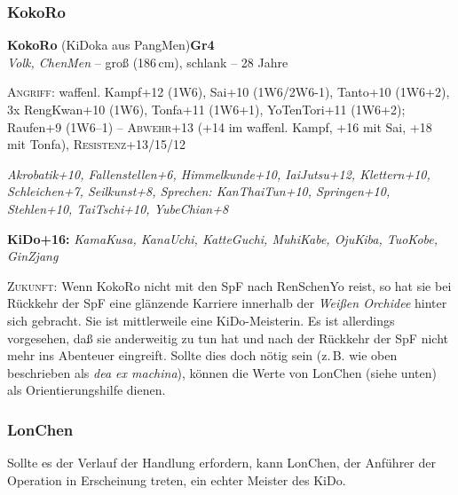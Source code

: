 \documentclass[
a4paper,
twoside,
DIV=calc,
BCOR=4mm,
fontsize=9pt,
twocolumn=on,
titlepage=on,
parskip=half
]{scrartcl}
\begin{document}
\subsubsection{KokoRo}



\textbf{KokoRo} (KiDoka aus PangMen)\hfill \textbf{Gr4}\\
\emph{Volk, ChenMen} -- groß (186\,cm), schlank -- 28 Jahre


\textsc{Angriff:} waffenl. Kampf+12 (1W6), Sai+10 (1W6/2W6-1),
Tanto+10 (1W6+2), 3x RengKwan+10 (1W6), Tonfa+11 (1W6+1), YoTenTori+11
(1W6+2); Raufen+9 (1W6--1) -- \textsc{Abwehr}+13 (+14 im
waffenl. Kampf, +16 mit Sai, +18 mit Tonfa),
\textsc{Resistenz}+13/15/12

\emph{Akrobatik+10, Fallenstellen+6, Himmelkunde+10, IaiJutsu+12,
  Klettern+10, Schleichen+7, Seilkunst+8, Sprechen: KanThaiTun+10,
  Springen+10, Stehlen+10, TaiTschi+10, YubeChian+8}

\textbf{KiDo+16:} \emph{KamaKusa, KanaUchi, KatteGuchi, MuhiKabe,
  OjuKiba, TuoKobe, GinZjang}

\textsc{Zukunft:} Wenn KokoRo nicht mit den SpF nach RenSchenYo reist,
so hat sie bei Rückkehr der SpF eine glänzende Karriere innerhalb der
\emph{Weißen Orchidee} hinter sich gebracht. Sie ist mittlerweile eine
KiDo-Meisterin. Es ist allerdings vorgesehen, daß sie anderweitig zu
tun hat und nach der Rückkehr der SpF nicht mehr ins Abenteuer
eingreift. Sollte dies doch nötig sein (z.\,B. wie oben beschrieben
als \emph{dea ex machina}), können die Werte von LonChen (siehe
unten) als Orientierungshilfe dienen.

\subsubsection{LonChen}

Sollte es der Verlauf der Handlung erfordern, kann LonChen, der
Anführer der Operation in Erscheinung treten, ein echter Meister des
KiDo.
\end{document}
